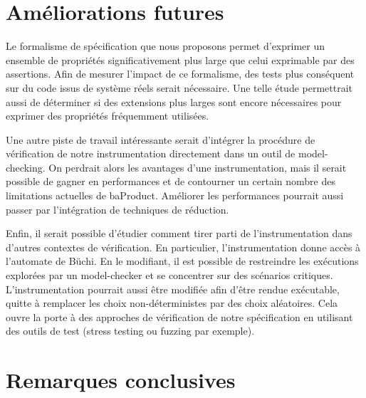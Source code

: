 
\section{Améliorations futures}

Le formalisme de spécification que nous proposons permet d'exprimer un ensemble
de propriétés significativement plus large que celui exprimable par des
assertions. Afin de mesurer l'impact de ce formalisme, des tests plus conséquent
sur du code issus de système réels serait nécessaire. Une telle étude
permettrait aussi de déterminer si des extensions plus larges sont encore
nécessaires pour exprimer des propriétés fréquemment utilisées.

Une autre piste de travail intéressante serait d'intégrer la procédure de
vérification de notre instrumentation directement dans un outil de
model-checking. On perdrait alors les avantages d'une instrumentation, mais il
serait possible de gagner en performances et de contourner un certain nombre des
limitations actuelles de baProduct. Améliorer les performances pourrait aussi
passer par l'intégration de techniques de réduction.

Enfin, il serait possible d'étudier comment tirer parti de l'instrumentation dans
d'autres contextes de vérification. En particulier, l'instrumentation donne
accès à l'automate de Büchi. En le modifiant, il est possible de restreindre les
exécutions explorées par un model-checker et se concentrer sur des scénarios
critiques. L'instrumentation pourrait aussi être modifiée afin d'être rendue
exécutable, quitte à remplacer les choix non-déterministes par des choix
aléatoires. Cela ouvre la porte à des approches de vérification de notre
spécification en utilisant des outils de test (stress testing ou fuzzing par
exemple).

\section{Remarques conclusives}

